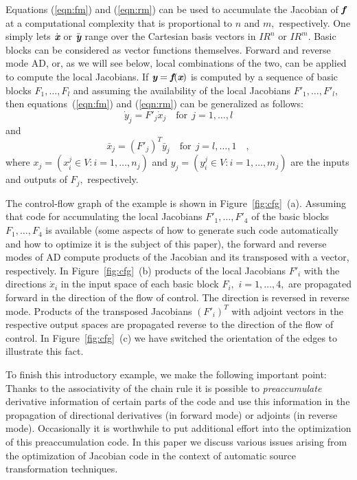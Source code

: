 \documentclass[acmtocl,acmnow]{acmtrans2m}
\newcommand{\R}{I\!\!R}
\newcommand{\bmf}{\mbox{\bf\em f}}
\newcommand{\bmx}{\mbox{\bf\em x}}
\newcommand{\bmy}{\mbox{\bf\em y}}
\newcommand{\reffig}[1]{Figure~\ref{#1}}
\begin{document}
Equations (\ref{eqn:fm}) and (\ref{eqn:rm}) can be used to accumulate the Jacobian of $\bmf$ at a computational complexity that is proportional to
$n$ and $m,$ respectively. One simply lets $\dot{\bmx}$ or $\bar{\bmy}$ range
over the Cartesian basis vectors in $\R^n$ or $\R^m.$
Basic blocks can be considered as vector functions themselves. 
Forward and reverse mode AD,
or, as we will see below, local combinations of the two, can be applied to
compute the local Jacobians. If $\bmy=\bmf(\bmx)$ is computed by
a sequence of basic blocks $F_1,\ldots,F_l$ and assuming the availability
of the local Jacobians 
$F'_1,\ldots,F'_l,$ then 
equations~(\ref{eqn:fm}) and (\ref{eqn:rm}) can be generalized as follows:
\begin{equation} \label{eqn:bbfm}
\dot{y}_j=F'_j \dot{x}_j \quad \text{for}~~j=1,\ldots,l
\end{equation} 
and 
\begin{equation} \label{eqn:bbrm}
\bar{x}_j=(F'_j)^T \bar{y}_j \quad \text{for}~~j=l,\ldots,1\quad ,
\end{equation} 
where $x_j = (x^j_i \in V :  i=1,\ldots,n_j)$ and
$y_j = (y^j_i \in V : i=1,\ldots,m_j)$ are the inputs and outputs of $F_j,$
respectively. 

The control-flow graph of the example is shown in \reffig{fig:cfg}~(a).
Assuming that code for accumulating the local Jacobians $F'_1, \ldots, F'_4$
of the basic blocks $F_1,\ldots,F_4$ is available (some aspects of how to generate
such code automatically and how to optimize it is the subject of this paper), 
the  forward and reverse modes of AD compute products
of the Jacobian and its transposed with a vector, respectively. In 
\reffig{fig:cfg}~(b) products of the local Jacobians $F'_i$ 
with the directions $\dot{x}_i$ in the input space of each basic block 
$F_i,$ $i=1,\ldots,4,$
are propagated forward in the direction of the flow of control. 
The direction is reversed in reverse mode. Products of the transposed
Jacobians $(F'_i)^T$ with adjoint vectors in the respective output spaces
are propagated reverse to the direction of the flow of control. In \reffig{fig:cfg}~(c) we have
switched the orientation of the edges to illustrate this fact.

To finish this introductory example, we make the following 
important point: Thanks to the associativity of the chain rule it is
possible to {\em preaccumulate} derivative information of certain parts
of the code and use this information in the propagation of directional
derivatives (in forward mode) or adjoints (in reverse mode). Occasionally
it is worthwhile to put additional effort into the optimization of this
preaccumulation code. In this paper we discuss various issues arising from
the optimization of Jacobian code in the context of automatic source 
transformation techniques.
\end{document}

